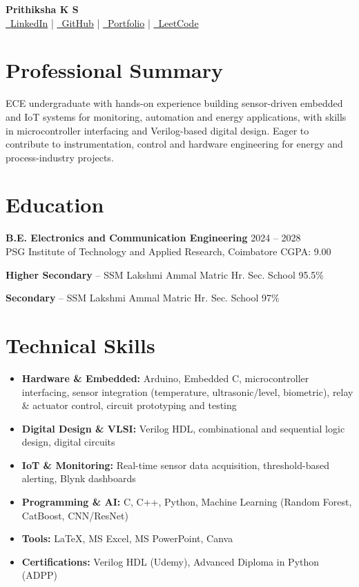 \documentclass[a4paper,10pt]{article}
\begin{document}
\pagestyle{empty}

\begin{center}
{\LARGE \textbf{Prithiksha K S}} \\[3pt]
{\small
\href{https://www.linkedin.com/in/prithikshaks-3139}{\faLinkedin\ LinkedIn}
\quad | \quad
\href{https://github.com/prithi-workspace09}{\faGithub\ GitHub}
\quad | \quad
\href{https://prithi-workspace09.github.io/prithiksha.github.io/}{\faGlobe\ Portfolio}
\quad | \quad
\href{https://leetcode.com/u/prithikshaks/}{\faCode\ LeetCode}}
\end{center}

\vspace{-8pt}

\section{Professional Summary}
ECE undergraduate with hands-on experience building sensor-driven embedded and IoT systems
for monitoring, automation and energy applications, with skills in microcontroller interfacing and
Verilog-based digital design. Eager to contribute to instrumentation,
control and hardware engineering for energy and process-industry projects.

\section{Education}
\textbf{B.E. Electronics and Communication Engineering} \hfill 2024 -- 2028 \\
PSG Institute of Technology and Applied Research, Coimbatore \hfill CGPA: 9.00

\textbf{Higher Secondary} -- SSM Lakshmi Ammal Matric Hr. Sec. School \hfill 95.5\%

\textbf{Secondary} -- SSM Lakshmi Ammal Matric Hr. Sec. School \hfill 97\%

\section{Technical Skills}
\begin{itemize}
\item \textbf{Hardware \& Embedded:} Arduino, Embedded C, microcontroller interfacing, sensor integration
      (temperature, ultrasonic/level, biometric), relay \& actuator control, circuit prototyping and testing
\item \textbf{Digital Design \& VLSI:} Verilog HDL, combinational and sequential logic design, digital circuits
\item \textbf{IoT \& Monitoring:} Real-time sensor data acquisition, threshold-based alerting, Blynk dashboards
\item \textbf{Programming \& AI:} C, C++, Python, Machine Learning (Random Forest, CatBoost, CNN/ResNet)
\item \textbf{Tools:} \LaTeX, MS Excel, MS PowerPoint, Canva
\item \textbf{Certifications:} Verilog HDL (Udemy), Advanced Diploma in Python (ADPP)
\end{itemize}
\end{document}
